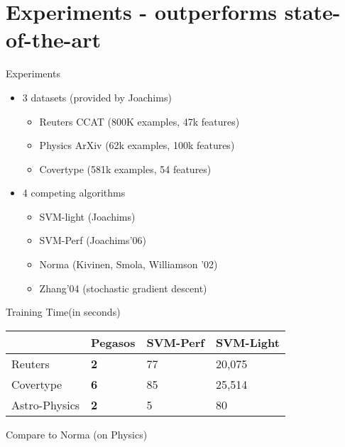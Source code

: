 \section{Experiments - outperforms state-of-the-art}
\begin{frame}{Experiments}
    \begin{itemize}
        \item 3 datasets (provided by Joachims) 
            \begin{itemize}
                \item Reuters CCAT (800K examples, 47k features)
                \item Physics ArXiv (62k examples, 100k features)
                \item Covertype (581k examples, 54 features)
            \end{itemize}
        \item 4 competing algorithms
            \begin{itemize}
                \item SVM-light (Joachims)
                \item SVM-Perf (Joachims'06)
                \item Norma (Kivinen, Smola, Williamson '02)
                \item Zhang'04 (stochastic gradient descent)
            \end{itemize}
    \end{itemize}
\end{frame}

\begin{frame}{Training Time(in seconds)}
\begin{table}[h]
    \begin{tabular}{|l|l|l|l|}
            \hline
             & Pegasos & SVM-Perf & SVM-Light \\ \hline
            Reuters & \textbf{2} & 77 & 20,075 \\ \hline
            Covertype & \textbf{6} & 85 & 25,514 \\ \hline
            Astro-Physics & \textbf{2} & 5 & 80 \\ \hline
        \end{tabular}
    \end{table}
\end{frame}

\begin{frame}{Compare to Norma (on Physics)}
\end{frame}

